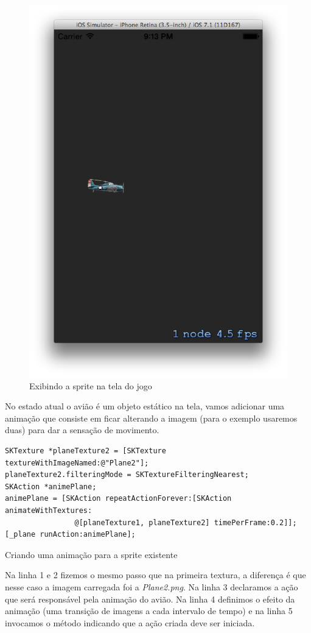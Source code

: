 \documentclass[a4paper,12pt,brazil,oneside]{book}
\begin{document}
\begin{figure}[H]
  \centering
  \includegraphics[width=.75\textwidth]{figuras/6/plane4.png}
  \caption{Exibindo a sprite na tela do jogo}
  \label{fig:a}
\end{figure}

No estado atual o avião é um objeto estático na tela, vamos adicionar uma animação que consiste em ficar alterando a imagem (para o exemplo usaremos duas) para dar a sensação de movimento.

\begin{listing}[H]
\begin{verbatim}
SKTexture *planeTexture2 = [SKTexture textureWithImageNamed:@"Plane2"];
planeTexture2.filteringMode = SKTextureFilteringNearest;
SKAction *animePlane;
animePlane = [SKAction repeatActionForever:[SKAction animateWithTextures:
				@[planeTexture1, planeTexture2] timePerFrame:0.2]];
[_plane runAction:animePlane];
\end{verbatim}
\caption{Criando uma animação para a sprite existente}
\end{listing}

Na linha 1 e 2 fizemos o mesmo passo que na primeira textura, a diferença é que nesse caso a imagem carregada foi a \emph{Plane2.png}. Na linha 3 declaramos a ação que será responsável pela animação do avião. Na linha 4 definimos o efeito da animação (uma transição de imagens a cada intervalo de tempo) e na linha 5 invocamos o método indicando que a ação criada deve ser iniciada.
\end{document}
